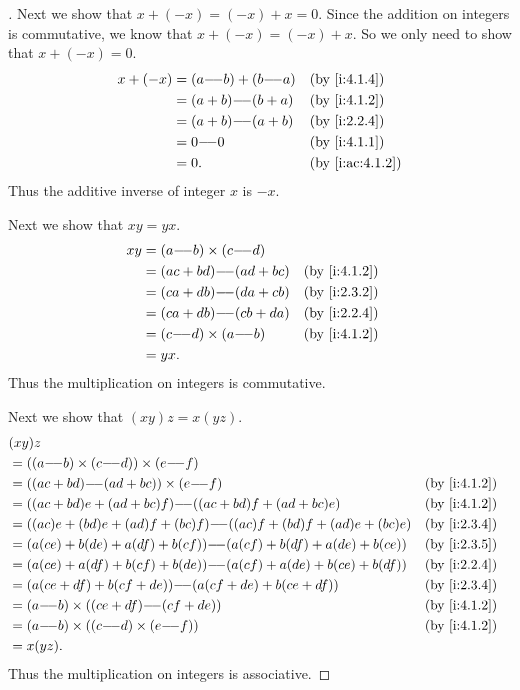 \begin{proof}[]
  Next we show that \(x + (-x) = (-x) + x = 0\).
  Since the addition on integers is commutative, we know that \(x + (-x) = (-x) + x\).
  So we only need to show that \(x + (-x) = 0\).
  \begin{align*}
    x + (-x) & = (a \mm b) + (b \mm a) &  & \by{i:4.1.4}    \\
             & = (a + b) \mm (b + a)   &  & \by{i:4.1.2}    \\
             & = (a + b) \mm (a + b)   &  & \by{i:2.2.4}    \\
             & = 0 \mm 0               &  & \by{i:4.1.1}    \\
             & = 0.                    &  & \by{i:ac:4.1.2}
  \end{align*}
  Thus the additive inverse of integer \(x\) is \(-x\).

  Next we show that \(xy = yx\).
  \begin{align*}
    xy & = (a \mm b) \times (c \mm d)                   \\
       & = (ac + bd) \mm (ad + bc)    &  & \by{i:4.1.2} \\
       & = (ca + db) \mm (da + cb)    &  & \by{i:2.3.2} \\
       & = (ca + db) \mm (cb + da)    &  & \by{i:2.2.4} \\
       & = (c \mm d) \times (a \mm b) &  & \by{i:4.1.2} \\
       & = yx.
  \end{align*}
  Thus the multiplication on integers is commutative.

  Next we show that \((xy)z = x(yz)\).
  \begin{align*}
     & (xy)z                                                                                   \\
     & = ((a \mm b) \times (c \mm d)) \times (e \mm f)                                         \\
     & = ((ac + bd) \mm (ad + bc)) \times (e \mm f)                          &  & \by{i:4.1.2} \\
     & = ((ac + bd)e + (ad + bc)f) \mm ((ac + bd)f + (ad + bc)e)             &  & \by{i:4.1.2} \\
     & = ((ac)e + (bd)e + (ad)f + (bc)f) \mm ((ac)f + (bd)f + (ad)e + (bc)e) &  & \by{i:2.3.4} \\
     & = (a(ce) + b(de) + a(df) + b(cf)) \mm (a(cf) + b(df) + a(de) + b(ce)) &  & \by{i:2.3.5} \\
     & = (a(ce) + a(df) + b(cf) + b(de)) \mm (a(cf) + a(de) + b(ce) + b(df)) &  & \by{i:2.2.4} \\
     & = (a(ce + df) + b(cf + de)) \mm (a(cf + de) + b(ce + df))             &  & \by{i:2.3.4} \\
     & = (a \mm b) \times ((ce + df) \mm (cf + de))                          &  & \by{i:4.1.2} \\
     & = (a \mm b) \times ((c \mm d) \times (e \mm f))                       &  & \by{i:4.1.2} \\
     & = x(yz).
  \end{align*}
  Thus the multiplication on integers is associative.


\end{proof}
